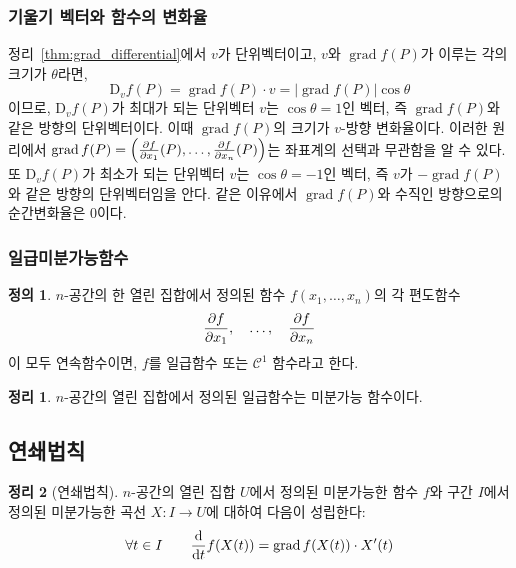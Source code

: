 \documentclass[unfonts,oneside,a4paper]{oblivoir}
\theoremstyle{definition}
\newtheorem{definition}{정의}[subsubsection]
\theoremstyle{theorem}
\newtheorem{theorem}{정리}[subsubsection]
\renewcommand{\vec}[1]{\bm{\mathit{#1}}}
\newcommand{\dD}{\mathrm{D}}
\DeclareMathOperator{\grad}{grad}
\begin{document}
\subsubsection{기울기 벡터와 함수의 변화율}
정리~\ref{thm:grad_differential}에서 $\vec v$가 단위벡터이고, $\vec v$와 $\grad f(P)$가 이루는 각의 크기가 $\theta$라면,
\begin{equation*}
    \dD_{\vec v} f(P) = \grad f(P) \cdot \vec v = |\grad f(P)| \cos \theta
\end{equation*}
이므로, $\dD_{\vec v} f(P)$가 최대가 되는 단위벡터 $\vec v$는 $\cos \theta = 1$인 벡터, 즉 $\grad f(P)$와 같은 방향의 단위벡터이다.
이때 $\grad f(P)$의 크기가 $\vec v$-방향 변화율이다.
이러한 원리에서 $\grad f(P) = \left(\diffp{f}{x_1}(P), \dots, \diffp{f}{x_n}(P)\right)$는 좌표계의 선택과 무관함을 알 수 있다.
또 $\dD_{\vec v} f(P)$가 최소가 되는 단위벡터 $\vec v$는 $\cos \theta = -1$인 벡터, 즉 $\vec v$가 $- \grad f(P)$와 같은 방향의 단위벡터임을 안다.
같은 이유에서 $\grad f(P)$와 수직인 방향으로의 순간변화율은 $0$이다.

\subsubsection{일급미분가능함수}

\begin{definition}
    $n$-공간의 한 열린 집합에서 정의된 함수 $f(x_1, \dots, x_n)$의 각 편도함수
    \begin{equation*}
        \diffp{f}{x_1},\quad\dots,\quad \diffp{f}{x_n}
    \end{equation*}
    이 모두 연속함수이면, $f$를 일급함수 또는 $\mathcal C^1$ 함수라고 한다.
\end{definition}

\begin{theorem}
    $n$-공간의 열린 집합에서 정의된 일급함수는 미분가능 함수이다.
\end{theorem}

\subsection{연쇄법칙}

\begin{theorem}[연쇄법칙]
    $n$-공간의 열린 집합 $U$에서 정의된 미분가능한 함수 $f$와 구간 $I$에서 정의된 미분가능한 곡선 $X: I \rightarrow U$에 대하여 다음이 성립한다:
    \begin{equation*}
        \forall t \in I \qquad \diff*{f(X(t))}{t} = \grad f(X(t)) \cdot X'(t)
    \end{equation*}
\end{theorem}
\end{document}
